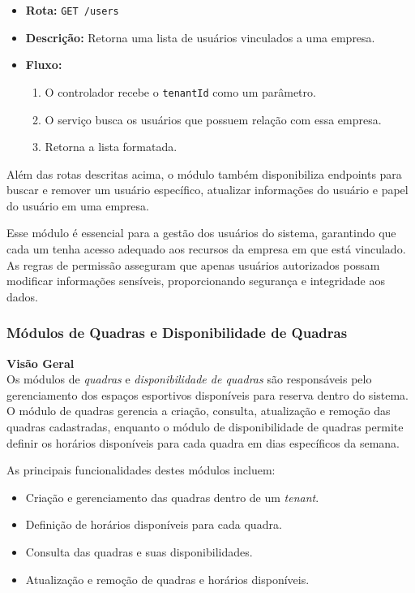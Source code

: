 \begin{itemize}
	\item \textbf{Rota:} \texttt{GET /users}
	\item \textbf{Descrição:} Retorna uma lista de usuários vinculados a uma empresa.
	\item \textbf{Fluxo:}
	\begin{enumerate}
		\item O controlador recebe o \texttt{tenantId} como um parâmetro.
		\item O serviço busca os usuários que possuem relação com essa empresa.
		\item Retorna a lista formatada.
	\end{enumerate}
\end{itemize}


Além das rotas descritas acima, o módulo também disponibiliza endpoints para buscar e remover um usuário específico, atualizar informações do usuário e papel do usuário em uma empresa.

Esse módulo é essencial para a gestão dos usuários do sistema, garantindo que cada um tenha acesso adequado aos recursos da empresa em que está vinculado. As regras de permissão asseguram que apenas usuários autorizados possam modificar informações sensíveis, proporcionando segurança e integridade aos dados.

\subsubsection{Módulos de Quadras e Disponibilidade de Quadras}\label{subsubsec:modulos_quadras_disponibilidade_quadras}

\textbf{Visão Geral}\\
Os módulos de \textit{quadras} e \textit{disponibilidade de quadras} são responsáveis pelo gerenciamento dos espaços esportivos disponíveis para reserva dentro do sistema. O módulo de quadras gerencia a criação, consulta, atualização e remoção das quadras cadastradas, enquanto o módulo de disponibilidade de quadras permite definir os horários disponíveis para cada quadra em dias específicos da semana.

As principais funcionalidades destes módulos incluem:

\begin{itemize}
    \item Criação e gerenciamento das quadras dentro de um \textit{tenant}.
    \item Definição de horários disponíveis para cada quadra.
    \item Consulta das quadras e suas disponibilidades.
    \item Atualização e remoção de quadras e horários disponíveis.
\end{itemize}

